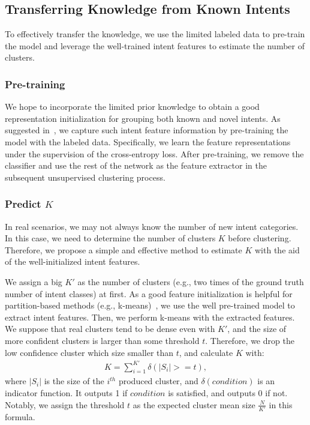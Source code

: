 \documentclass[letterpaper]{article} \usepackage{aaai21}  \usepackage{times}  \usepackage{helvet} \usepackage{courier}  \usepackage[hyphens]{url}  \usepackage{graphicx} \urlstyle{rm} \def\UrlFont{\rm}  \usepackage{natbib}  \usepackage{caption} \frenchspacing  \setlength{\pdfpagewidth}{8.5in}  \setlength{\pdfpageheight}{11in}  \usepackage{amsmath}
\begin{document}
	\subsection{Transferring Knowledge from Known Intents}
	To effectively transfer the knowledge, we use the limited labeled data to pre-train the model and leverage the well-trained intent features to estimate the number of clusters.
	
	\subsubsection{Pre-training} We hope to incorporate the limited prior knowledge to obtain a good representation initialization for grouping both known and novel intents. As suggested in~\cite{Han2019learning}, we capture such intent feature information by pre-training the model with the labeled data. Specifically, we learn the feature representations under the supervision of the cross-entropy loss. After pre-training, we remove the classifier and use the rest of the network as the feature extractor in the subsequent unsupervised clustering process.
	
	\subsubsection{Predict $K$}
	In real scenarios, we may not always know the number of new intent categories. 
	In this case, we need to determine the number of clusters $K$ before clustering. Therefore, we propose a simple and effective method to estimate $K$ with the aid of the well-initialized intent features.
	
	We assign a big $K'$ as the number of clusters (e.g., two times of the ground truth number of intent classes) at first. As a good feature initialization is helpful for partition-based methods (e.g., k-means)~\cite{platt1999probabilistic}, we use the well pre-trained model to extract intent features. Then, we perform k-means with the extracted features. We suppose that real clusters tend to be dense even with $K'$, and the size of more confident clusters is larger than some threshold $t$. Therefore, we drop the low confidence cluster which size smaller than $t$, and calculate $K$ with:
	\begin{align}
		K = \sum_{i=1}^{K'}\delta(|S_{i}| >= t),
	\end{align}
	where $|S_{i}|$ is the size of the $i^{th}$ produced cluster, and $\delta{(condition)}$ is an indicator function. It outputs 1 if $condition$ is satisfied, and outputs 0 if not. Notably, we assign the threshold $t$ as the expected cluster mean size $\frac{N}{K'}$ in this formula.
	
\end{document}
